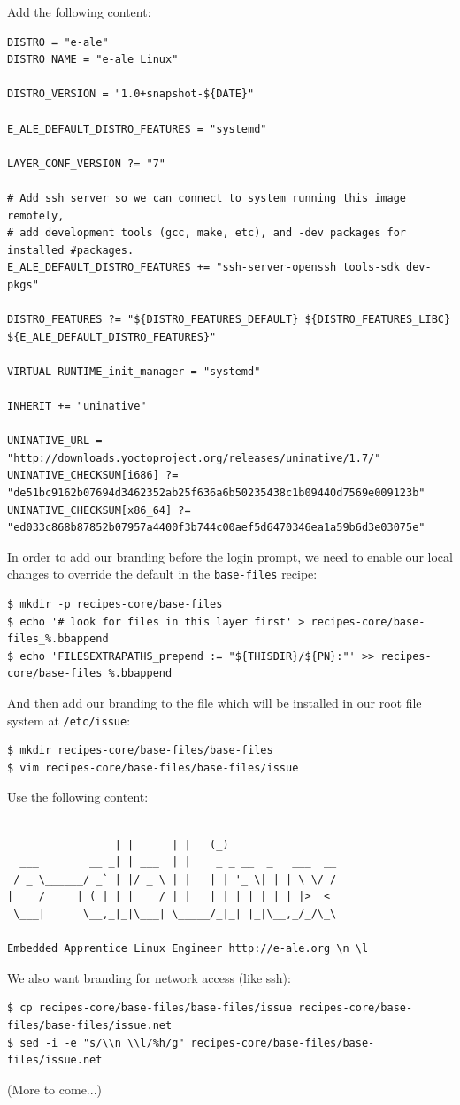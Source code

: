 \documentclass[a4paper,12pt,obeyspaces,spaces,hyphens]{article}
\begin{document}
Add the following content:
\begin{tcolorbox}[enhanced jigsaw,colback=bg,boxrule=0pt,arc=0pt]
\begin{verbatim}
DISTRO = "e-ale"
DISTRO_NAME = "e-ale Linux"

DISTRO_VERSION = "1.0+snapshot-${DATE}"

E_ALE_DEFAULT_DISTRO_FEATURES = "systemd"

LAYER_CONF_VERSION ?= "7"

# Add ssh server so we can connect to system running this image remotely,
# add development tools (gcc, make, etc), and -dev packages for installed #packages.
E_ALE_DEFAULT_DISTRO_FEATURES += "ssh-server-openssh tools-sdk dev-pkgs"

DISTRO_FEATURES ?= "${DISTRO_FEATURES_DEFAULT} ${DISTRO_FEATURES_LIBC} ${E_ALE_DEFAULT_DISTRO_FEATURES}"

VIRTUAL-RUNTIME_init_manager = "systemd"

INHERIT += "uninative"

UNINATIVE_URL = "http://downloads.yoctoproject.org/releases/uninative/1.7/"
UNINATIVE_CHECKSUM[i686] ?= "de51bc9162b07694d3462352ab25f636a6b50235438c1b09440d7569e009123b"
UNINATIVE_CHECKSUM[x86_64] ?= "ed033c868b87852b07957a4400f3b744c00aef5d6470346ea1a59b6d3e03075e"
\end{verbatim}
\end{tcolorbox}

In order to add our branding before the login prompt, we need to enable our local changes to override the default in the \texttt{base-files} recipe:

\begin{verbatim}
$ mkdir -p recipes-core/base-files
$ echo '# look for files in this layer first' > recipes-core/base-files_%.bbappend
$ echo 'FILESEXTRAPATHS_prepend := "${THISDIR}/${PN}:"' >> recipes-core/base-files_%.bbappend
\end{verbatim}

And then add our branding to the file which will be installed in our root file system at \texttt{/etc/issue}:

\begin{verbatim}
$ mkdir recipes-core/base-files/base-files
$ vim recipes-core/base-files/base-files/issue
\end{verbatim}

Use the following content:

\begin{tcolorbox}[enhanced jigsaw,colback=bg,boxrule=0pt,arc=0pt]
\begin{verbatim}
                  _        _     _
                 | |      | |   (_)
  ___        __ _| | ___  | |    _ _ __  _   ___  __
 / _ \______/ _` | |/ _ \ | |   | | '_ \| | | \ \/ /
|  __/_____| (_| | |  __/ | |___| | | | | |_| |>  <
 \___|      \__,_|_|\___| \_____/_|_| |_|\__,_/_/\_\

Embedded Apprentice Linux Engineer http://e-ale.org \n \l
\end{verbatim}
\end{tcolorbox}

We also want branding for network access (like ssh):
\begin{verbatim}
$ cp recipes-core/base-files/base-files/issue recipes-core/base-files/base-files/issue.net
$ sed -i -e "s/\\n \\l/%h/g" recipes-core/base-files/base-files/issue.net
\end{verbatim}

(More to come...)
\end{document}
